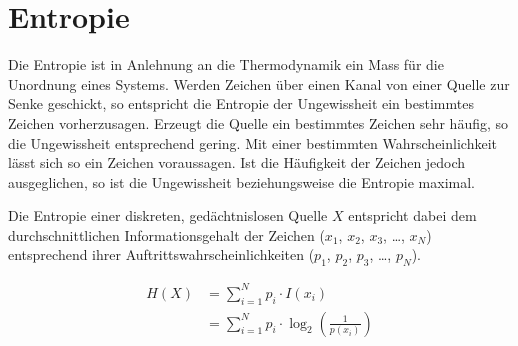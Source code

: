 \section{Entropie}

Die Entropie ist in Anlehnung an die Thermodynamik ein Mass für die Unordnung eines Systems. Werden Zeichen über einen Kanal von einer Quelle zur Senke geschickt, so entspricht die Entropie der Ungewissheit ein bestimmtes Zeichen vorherzusagen. Erzeugt die Quelle ein bestimmtes Zeichen sehr häufig, so die Ungewissheit entsprechend gering. Mit einer bestimmten Wahrscheinlichkeit lässt sich so ein Zeichen voraussagen. Ist die Häufigkeit der Zeichen jedoch ausgeglichen, so ist die Ungewissheit beziehungsweise die Entropie maximal. 

Die Entropie einer diskreten, gedächtnislosen Quelle $X$ entspricht dabei dem durchschnittlichen Informationsgehalt der Zeichen ($x_1$, $x_2$, $x_3$, \ldots, $x_N$) entsprechend ihrer Auftrittswahrscheinlichkeiten ($p_1$, $p_2$, $p_3$, \ldots, $p_N$). 

\begin{align*}
H(X)& =\sum\limits_{i=1}^N p_i \cdot I(x_i) \\
& =\sum\limits_{i=1}^N p_i \cdot \log_2\left(\frac{1}{p(x_i)}\right)
\end{align*}